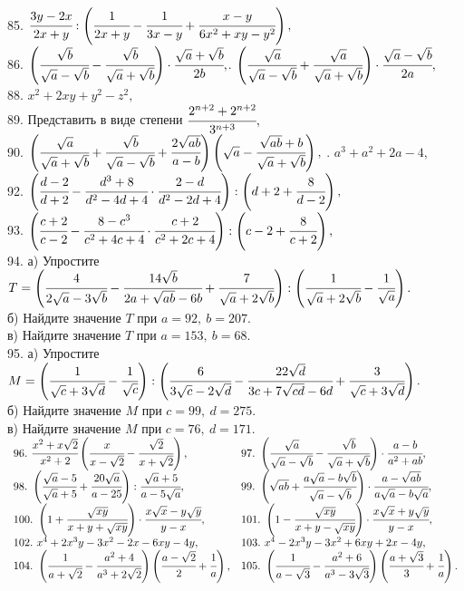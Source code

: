 \documentclass[12pt]{article}
\begin{document}
85. $\cfrac{3y-2x}{2x+y}:\left(\cfrac{1}{2x+y}-\cfrac{1}{3x-y}+\cfrac{x-y}{6x^2+xy-y^2}\right),$\\
86. $\left(\cfrac{\sqrt{b}}{\sqrt{a}-\sqrt{b}}-\cfrac{\sqrt{b}}{\sqrt{a}+\sqrt{b}}\right)\cdot\cfrac{\sqrt{a}+\sqrt{b}}{2b},$\qquad{}. $\left(\cfrac{\sqrt{a}}{\sqrt{a}-\sqrt{b}}+\cfrac{\sqrt{a}}{\sqrt{a}+\sqrt{b}}\right)\cdot\cfrac{\sqrt{a}-\sqrt{b}}{2a},$\\
88. $x^2+2xy+y^2-z^2,$\\
89. Представить в виде степени $\cfrac{2^{n+2}+2^{n+2}}{3^{n+3}},$\\
90. $\left(\cfrac{\sqrt{a}}{\sqrt{a}+\sqrt{b}}+\cfrac{\sqrt{b}}{\sqrt{a}-\sqrt{b}}+\cfrac{2\sqrt{ab}}{a-b}\right)\left(\sqrt{a}-\cfrac{\sqrt{ab}+b}{\sqrt{a}+\sqrt{b}}\right),$
. $a^3+a^2+2a-4,$\\
92. $\left(\cfrac{d-2}{d+2}-\cfrac{d^3+8}{d^2-4d+4}\cdot\cfrac{2-d}{d^2-2d+4}\right):\left(d+2+\cfrac{8}{d-2}\right),$\\
93. $\left(\cfrac{c+2}{c-2}-\cfrac{8-c^3}{c^2+4c+4}\cdot\cfrac{c+2}{c^2+2c+4}\right):\left(c-2+\cfrac{8}{c+2}\right),$\\
94. а) Упростите $T=\left(\cfrac{4}{2\sqrt{a}-3\sqrt{b}}-\cfrac{14\sqrt{b}}{2a+\sqrt{ab}-6b}+\cfrac{7}{\sqrt{a}+2\sqrt{b}}\right):\left(\cfrac{1}{\sqrt{a}+2\sqrt{b}}-\cfrac{1}{\sqrt{a}}\right).$\\
б) Найдите значение $T$ при $a=92,\ b=207.$\\
в) Найдите значение $T$ при $a=153,\ b=68.$\\
95. а) Упростите $M=\left(\cfrac{1}{\sqrt{c}+3\sqrt{d}}-\cfrac{1}{\sqrt{c}}\right):\left(\cfrac{6}{3\sqrt{c}-2\sqrt{d}}-\cfrac{22\sqrt{d}}{3c+7\sqrt{cd}-6d}+\cfrac{3}{\sqrt{c}+3\sqrt{d}}\right).$\\
б) Найдите значение $M$ при $c=99,\ d=275.$\\
в) Найдите значение $M$ при $c=76,\ d=171.$\\
$\begin{array}{ll}
96.\ \cfrac{x^2+x\sqrt{2}}{x^2+2}\left(\cfrac{x}{x-\sqrt{2}}-\cfrac{\sqrt{2}}{x+\sqrt{2}}\right),&
97.\ \left(\cfrac{\sqrt{a}}{\sqrt{a}-\sqrt{b}}-\cfrac{\sqrt{b}}{\sqrt{a}+\sqrt{b}}\right)\cdot\cfrac{a-b}{a^2+ab},\\
98.\ \left(\cfrac{\sqrt{a}-5}{\sqrt{a}+5}+\cfrac{20\sqrt{a}}{a-25}\right):\cfrac{\sqrt{a}+5}{a-5\sqrt{a}},&
99.\ \left(\sqrt{ab}+\cfrac{a\sqrt{a}-b\sqrt{b}}{\sqrt{a}-\sqrt{b}}\right)\cdot\cfrac{a-\sqrt{ab}}{a\sqrt{a}-b\sqrt{a}},\\
100.\ \left(1+\cfrac{\sqrt{xy}}{x+y+\sqrt{xy}}\right)\cdot\cfrac{x\sqrt{x}-y\sqrt{y}}{y-x},&
101.\ \left(1-\cfrac{\sqrt{xy}}{x+y-\sqrt{xy}}\right)\cdot\cfrac{x\sqrt{x}+y\sqrt{y}}{y-x},\\
102.\ x^4+2x^3y-3x^2-2x-6xy-4y,&
103.\ x^4-2x^3y-3x^2+6xy+2x-4y,\\
104.\ \left(\cfrac{1}{a+\sqrt{2}}-\cfrac{a^2+4}{a^3+2\sqrt{2}}\right) \left (\cfrac{a-\sqrt{2}}{2}+\cfrac{1}{a}\right),&
105.\ \left(\cfrac{1}{a-\sqrt{3}}-\cfrac{a^2+6}{a^3-3\sqrt{3}}\right) \left (\cfrac{a+\sqrt{3}}{3}+\cfrac{1}{a}\right).
\end{array}$
\newpage
\end{document}
